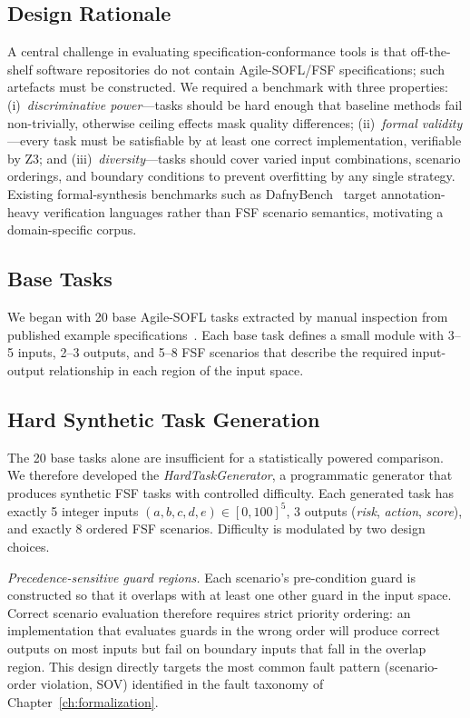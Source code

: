\subsection{Design Rationale}

A central challenge in evaluating specification-conformance tools is that
off-the-shelf software repositories do not contain Agile-SOFL\slash FSF
specifications; such artefacts must be constructed.  We required a benchmark with
three properties: (i)~\emph{discriminative power}---tasks should be hard enough
that baseline methods fail non-trivially, otherwise ceiling effects mask quality
differences; (ii)~\emph{formal validity}---every task must be satisfiable by at
least one correct implementation, verifiable by Z3; and
(iii)~\emph{diversity}---tasks should cover varied input combinations, scenario
orderings, and boundary conditions to prevent overfitting by any single strategy.
Existing formal-synthesis benchmarks such as DafnyBench~\citep{loughman2024dafnybench}
target annotation-heavy verification languages rather than FSF scenario semantics,
motivating a domain-specific corpus.

\subsection{Base Tasks}

We began with 20 base Agile-SOFL tasks extracted by manual inspection from published
example specifications~\citep{liu2014sofl,li2022agilesofl}.  Each base task defines a small module with 3--5 inputs, 2--3
outputs, and 5--8 FSF scenarios that describe the required input-output relationship
in each region of the input space.

\subsection{Hard Synthetic Task Generation}

The 20 base tasks alone are insufficient for a statistically powered comparison.  We
therefore developed the \emph{HardTaskGenerator}, a programmatic generator that
produces synthetic FSF tasks with controlled difficulty.  Each generated task has
exactly 5 integer inputs $(a, b, c, d, e) \in [0, 100]^5$, 3 outputs
(\textit{risk}, \textit{action}, \textit{score}), and exactly 8 ordered FSF
scenarios.  Difficulty is modulated by two design choices.

\emph{Precedence-sensitive guard regions.}  Each scenario's pre-condition guard is
constructed so that it overlaps with at least one other guard in the input space.
Correct scenario evaluation therefore requires strict priority ordering: an
implementation that evaluates guards in the wrong order will produce correct outputs
on most inputs but fail on boundary inputs that fall in the overlap region.  This
design directly targets the most common fault pattern (scenario-order
violation, SOV) identified in the fault taxonomy of
Chapter~\ref{ch:formalization}.

